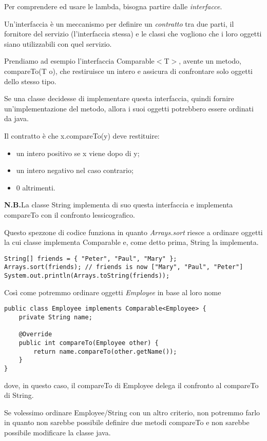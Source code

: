 Per comprendere ed usare le lambda, bisogna partire dalle \textit{interfacce}.

Un'interfaccia è un meccanismo per definire un \textit{contratto} tra due parti, il fornitore del servizio (l'interfaccia stessa) e le classi che vogliono 
che i loro oggetti siano utilizzabili con quel servizio.

Prendiamo ad esempio l'interfaccia Comparable$<$T$>$, avente un metodo, compareTo(T o), che restiruisce un intero e assicura di confrontare solo oggetti dello 
stesso tipo.

Se una classe decidesse di implementare questa interfaccia, quindi fornire un'implementazione del metodo, allora i suoi oggetti potrebbero essere ordinati da 
java.

Il contratto è che x.compareTo(y) deve restituire:
\begin{itemize}
    \item un intero positivo se x viene dopo di y;
    \item un intero negativo nel caso contrario;
    \item 0 altrimenti.
\end{itemize}

\textbf{N.B.}La classe String implementa di suo questa interfaccia e implementa compareTo con il confronto lessicografico.

Questo spezzone di codice funziona in quanto \textit{Arrays.sort} riesce a ordinare oggetti la cui classe implementa Comparable e, come detto prima, String la 
implementa.
\begin{lstlisting}
String[] friends = { "Peter", "Paul", "Mary" };
Arrays.sort(friends); // friends is now ["Mary", "Paul", "Peter"]
System.out.println(Arrays.toString(friends));
\end{lstlisting}

Così come potremmo ordinare oggetti \textit{Employee} in base al loro nome
\begin{lstlisting}
public class Employee implements Comparable<Employee> {
    private String name;

    @Override
    public int compareTo(Employee other) {
        return name.compareTo(other.getName());
    }
}
\end{lstlisting}
dove, in questo caso, il compareTo di Employee delega il confronto al compareTo di String.

Se volessimo ordinare Employee/String con un altro criterio, non potremmo farlo in quanto non sarebbe possibile definire due metodi compareTo e non sarebbe possibile
modificare la classe java.

